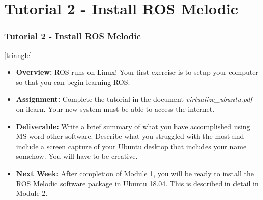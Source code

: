 \documentclass[fleqn]{beamer}                         %
\newcommand{\vspc}{\vspace{2mm}\\}     %
\newcommand{\sectiontitleV}{Tutorial 2 - Install ROS Melodic}
\begin{document}
\section{\sectiontitleV}	
	            \begin{frame}[label=sectionV] \small
		\frametitle{\sectiontitleV}    
	
 [triangle]
                \begin{itemize}

					\item {\bf Overview:} ROS runs on Linux! Your first exercise is to setup your computer so that you can begin learning ROS. 		

					\item {\bf Assignment:} Complete the tutorial in the document {\it virtualize\_ubuntu.pdf} on ilearn. Your new system must be able to access the internet.
                    
                    \item {\bf Deliverable:} Write a brief summary of what you have accomplished using MS word other software. Describe what you struggled with the most and include a screen capture of your Ubuntu desktop that includes your name somehow. You will have to be creative.   
    
                    \item {\bf Next Week:} After completion of Module 1, you will be ready to install the ROS Melodic software package in Ubuntu 18.04. This is described in detail in Module 2. \vspc
                    
    
                    
                \end{itemize}
		\end{frame}
\end{document}
